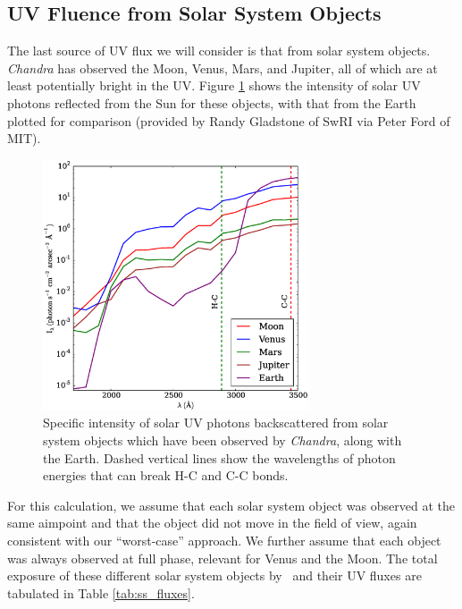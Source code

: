 \documentclass[11pt]{article}
\begin{document}
\subsection{UV Fluence from Solar System Objects}\label{sec:ssobj}

The last source of UV flux we will consider is that from solar system objects. {\it Chandra} has observed the
Moon, Venus, Mars, and Jupiter, all of which are at least potentially bright in the UV. Figure \ref{fig:ss_obj_intensity}
shows the intensity of solar UV photons reflected from the Sun for these objects, with that from the Earth plotted for
comparison (provided by Randy Gladstone of SwRI via Peter Ford of MIT).

\begin{figure}
\begin{center}
\includegraphics[width=0.7\textwidth]{ss_obj_intensity.eps}
\caption{Specific intensity of solar UV photons backscattered from solar system objects which have been observed by
{\it Chandra}, along with the Earth. Dashed vertical lines show the wavelengths of photon energies that can break
H-C and C-C bonds.\label{fig:ss_obj_intensity}}
\end{center}
\end{figure}

For this calculation, we assume that each solar system object was observed at the same aimpoint and that the object
did not move in the field of view, again consistent with our ``worst-case'' approach. We further assume that each
object was always observed at full phase, relevant for Venus and the Moon. The total exposure of these different
solar system objects by \chandra~and their UV fluxes are tabulated in Table \ref{tab:ss_fluxes}.
\end{document}
